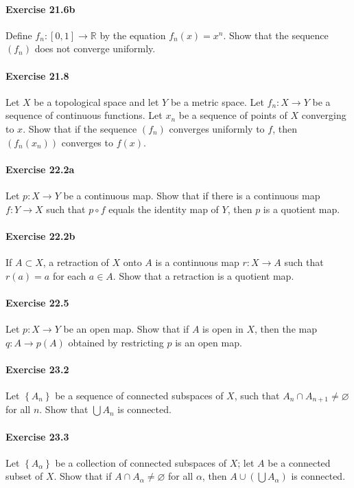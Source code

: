 \documentclass{article}
\begin{document}
\paragraph{Exercise 21.6b} Define $f_{n}:[0,1] \rightarrow \mathbb{R}$ by the equation $f_{n}(x)=x^{n}$. Show that the sequence $\left(f_{n}\right)$ does not converge uniformly.

\paragraph{Exercise 21.8} Let $X$ be a topological space and let $Y$ be a metric space. Let $f_{n}: X \rightarrow Y$ be a sequence of continuous functions. Let $x_{n}$ be a sequence of points of $X$ converging to $x$. Show that if the sequence $\left(f_{n}\right)$ converges uniformly to $f$, then $\left(f_{n}\left(x_{n}\right)\right)$ converges to $f(x)$.

\paragraph{Exercise 22.2a} Let $p: X \rightarrow Y$ be a continuous map. Show that if there is a continuous map $f: Y \rightarrow X$ such that $p \circ f$ equals the identity map of $Y$, then $p$ is a quotient map.

\paragraph{Exercise 22.2b} If $A \subset X$, a retraction of $X$ onto $A$ is a continuous map $r: X \rightarrow A$ such that $r(a)=a$ for each $a \in A$. Show that a retraction is a quotient map.

\paragraph{Exercise 22.5} Let $p \colon X \rightarrow Y$ be an open map. Show that if $A$ is open in $X$, then the map $q \colon A \rightarrow p(A)$ obtained by restricting $p$ is an open map.

\paragraph{Exercise 23.2} Let $\left\{A_{n}\right\}$ be a sequence of connected subspaces of $X$, such that $A_{n} \cap A_{n+1} \neq \varnothing$ for all $n$. Show that $\bigcup A_{n}$ is connected.

\paragraph{Exercise 23.3} Let $\left\{A_{\alpha}\right\}$ be a collection of connected subspaces of $X$; let $A$ be a connected subset of $X$. Show that if $A \cap A_{\alpha} \neq \varnothing$ for all $\alpha$, then $A \cup\left(\bigcup A_{\alpha}\right)$ is connected.
\end{document}
